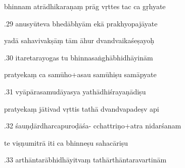 \documentclass[article,12pt,a4paper]{memoir}%
\newcounter{parCount}
\begin{document}
	  
	  \pstart \leavevmode%
	bhinnam atrādhikaraṇaṃ prāg vṛttes tac ca gṛhyate 
	{}
	\pend%
      

	  
	  \pstart {}.29 anusyūteva bhedābhyām ekā prakhyopajāyate 
	{}
	\pend%
      

	  
	  \pstart \leavevmode%
	yadā sahavivakṣāṃ tām āhur dvandvaikaśeṣayoḥ 
	{}
	\pend%
      

	  
	  \pstart {}.30 itaretarayogas tu bhinnasaṅghābhidhāyinām 
	{}
	\pend%
      

	  
	  \pstart \leavevmode%
	pratyekaṃ ca samūho+asau samūhiṣu samāpyate 
	{}
	\pend%
      

	  
	  \pstart {}.31 vyāpārasamudāyasya yathādhiśrayaṇādiṣu 
	{}
	\pend%
      

	  
	  \pstart \leavevmode%
	pratyekaṃ jātivad vṛttis tathā dvandvapadeṣv api 
	{}
	\pend%
      

	  
	  \pstart {}.32 śauṇḍārdharcapuroḍāśa- cchattriṇo+atra nidarśanam 
	{}
	\pend%
      

	  
	  \pstart \leavevmode%
	te viṣṇumitrā iti ca bhinneṣu sahacāriṣu 
	{}
	\pend%
      

	  
	  \pstart {}.33 arthāntarābhidhāyitvaṃ   tathārthāntaravartinām 
	{}
	\pend%
      
\end{document}

